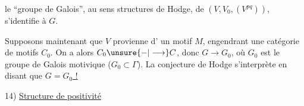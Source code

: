 le ``groupe de Galois'', au sens structures de %
Hodge, de $(V,V_0,(V^{pq}))$, s'identifie à $G$. %

Supposons maintenant que $V$ provienne d'%
un motif $M$, engendrant une \inserted{$\otimes$-}catégorie de %
motifs $C_0$. On a alors $C_0\unsure{-|\longrightarrow}C$, donc %
$G\longrightarrow G_0$, où $G_0$ est le groupe de Galois %
motivique ($G_0\subset\Gamma$). La conjecture de %
Hodge s'interprète en disant que \uline{$G=G_0$ !} %

14) \uline{Structure de positivité} %

